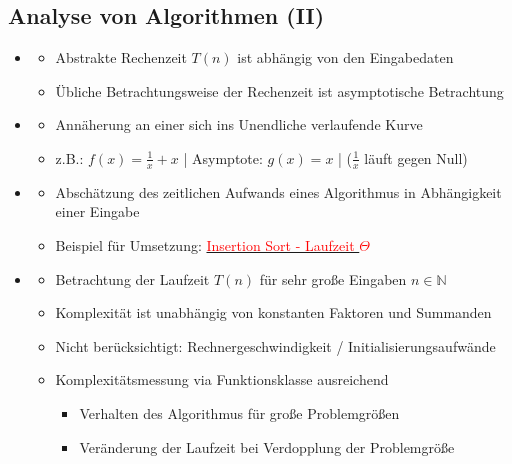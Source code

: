 \documentclass[
    ngerman,
    color=3b,
    load_common, %
    summary,
    boxarc,
]{tuda_summary}
\begin{document}
\subsection{Analyse von Algorithmen \textmd{(II)}}\label{Analyse von Algorithmen 2}
\begin{itemize}
    \item {}
          \begin{itemize}
              \item Abstrakte Rechenzeit $T(n)$ ist abhängig von den Eingabedaten
              \item Übliche Betrachtungsweise der Rechenzeit ist asymptotische Betrachtung
          \end{itemize}

    \item {}
          \begin{itemize}
              \item Annäherung an einer sich ins Unendliche verlaufende Kurve
              \item z.B.: $f(x) = \frac{1}{x} + x$ | Asymptote: $g(x)=x$ | ($\frac{1}{x}$ läuft gegen Null)
          \end{itemize}

    \item {}
          \begin{itemize}
              \item Abschätzung des zeitlichen Aufwands eines Algorithmus in Abhängigkeit einer Eingabe
              \item Beispiel für Umsetzung: \hyperref[insSortLaufzeitTheta]{\textcolor{red}{Insertion Sort - Laufzeit $\Theta$}}
          \end{itemize}

    \item {}
          \begin{itemize}
              \item Betrachtung der Laufzeit $T(n)$ für sehr gro\ss e Eingaben $n \in \mathbb{N}$
              \item Komplexität ist unabhängig von konstanten Faktoren und Summanden
              \item Nicht berücksichtigt: Rechnergeschwindigkeit / Initialisierungsaufwände
              \item Komplexitätsmessung via Funktionsklasse ausreichend
                    \begin{itemize}
                        \item Verhalten des Algorithmus für gro\ss e Problemgrö\ss en
                        \item Veränderung der Laufzeit bei Verdopplung der Problemgrö\ss e
                    \end{itemize}
          \end{itemize}


\end{itemize}
\end{document}
